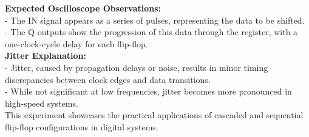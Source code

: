 \documentclass{article}
\begin{document}
    \textbf{Expected Oscilloscope Observations:} \\
    - The IN signal appears as a series of pulses, representing the data to be shifted. \\
    - The Q outputs show the progression of this data through the register, with a one-clock-cycle delay for each flip-flop. \\

    \textbf{Jitter Explanation:} \\
    - Jitter, caused by propagation delays or noise, results in minor timing discrepancies between clock edges and data transitions. \\
    - While not significant at low frequencies, jitter becomes more pronounced in high-speed systems. \\

    This experiment showcases the practical applications of cascaded and sequential flip-flop configurations in digital systems.

    


  
\end{document}
